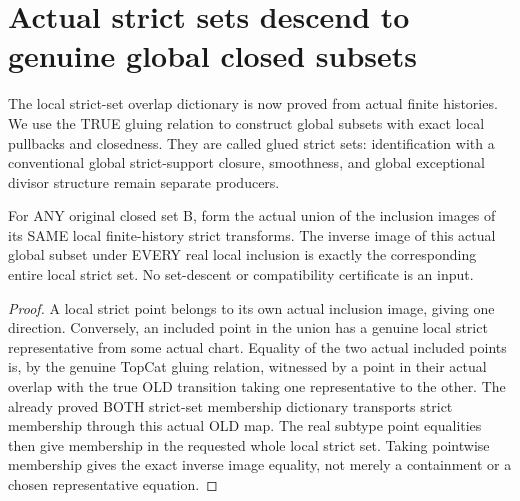 \section{Actual strict sets descend to genuine global closed subsets}

The local strict-set overlap dictionary is now proved from actual finite
histories. We use the TRUE gluing relation to construct global subsets with
exact local pullbacks and closedness. They are called glued strict sets:
identification with a conventional global strict-support closure, smoothness,
and global exceptional divisor structure remain separate producers.

\begin{theorem}
\label{hir:sharp-actual-glued-strict-set-local-dictionary}
\leanok
For ANY original closed set B, form the actual union of the inclusion images
of its SAME local finite-history strict transforms. The inverse image of
this actual global subset under EVERY real local inclusion is exactly the
corresponding entire local strict set. No set-descent or compatibility
certificate is an input.
\end{theorem}
\begin{proof}
A local strict point belongs to its own actual inclusion image, giving one
direction. Conversely, an included point in the union has a genuine local
strict representative from some actual chart. Equality of the two actual
included points is, by the genuine TopCat gluing relation, witnessed by a
point in their actual overlap with the true OLD transition taking one
representative to the other. The already proved BOTH strict-set membership
dictionary transports strict membership through this actual OLD map.
The real subtype point equalities then give membership in the requested
whole local strict set. Taking pointwise membership gives the exact inverse
image equality, not merely a containment or a chosen representative equation.
\end{proof}

